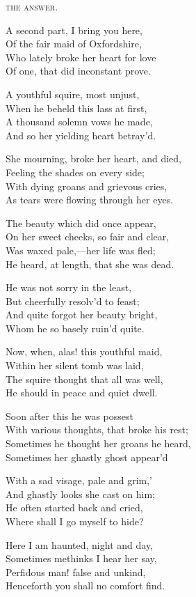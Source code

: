 \begin{dcverse}
\vin\vin\vin\textsc{the answer.}

A second part, I bring you here,\\
Of the fair maid of Oxfordshire,\\
Who lately broke her heart for love\\
Of one, that did inconstant prove.

A youthful squire, most unjust,\\
When he beheld this lass at first,\\
A thousand solemn vows he made,\\
And so her yielding heart betray’d.

She mourning, broke her heart, and died,\\
Feeling the shades on every side;\\
With dying groans and grievous cries,\\
As tears were flowing through her eyes.

The beauty which did once appear,\\
On her sweet cheeks, so fair and clear,\\
Was waxed pale,—her life was fled;\\
He heard, at length, that she was dead.

He was not sorry in the least,\\
But cheerfully resolv’d to feast;\\
And quite forgot her beauty bright,\\
Whom he so basely ruin’d quite.

Now, when, alas! this youthful maid,\\
Within her silent tomb was laid,\\
The squire thought that all was well,\\
He should in peace and quiet dwell.

Soon after this he was possest\\
With various thoughts, that broke his rest;\\
Sometimes he thought her groans he heard,\\
Sometimes her ghastly ghost appear’d

With a sad visage, pale and grim,'\\
And ghastly looks she cast on him;\\
He often started back and cried,\\
Where shall I go myself to hide?

Here I am haunted, night and day,\\
Sometimes methinks I hear her say,\\
Perfidous man! false and unkind,\\
Henceforth you shall no comfort find.


\end{dcverse}
